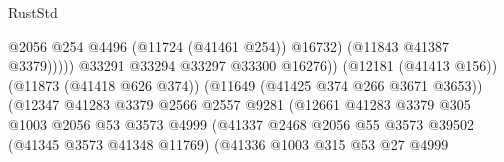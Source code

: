 \begin{lexlean}{RustStd}
\begin{coremodule}
                                                              @2056
                                                              @254
                                                              @4496
                                                              (@11724 (@41461 @254))
                                                              @16732)
                                                            (@11843 @41387 @3379)))))
                                                    @33291
                                                    @33294
                                                    @33297
                                                    @33300
                                                    @16276))
                                                (@12181 (@41413 @156))
                                                (@11873 (@41418 @626 @374))
                                                (@11649 (@41425 @374 @266 @3671 @3653))
                                                (@12347
                                                  @41283
                                                  @3379
                                                  @2566
                                                  @2557
                                                  @9281
                                                  (@12661
                                                    @41283
                                                    @3379
                                                    @305
                                                    @1003
                                                    @2056
                                                    @53
                                                    @3573
                                                    @4999
                                                    (@41337
                                                      @2468
                                                      @2056
                                                      @55
                                                      @3573
                                                      @39502
                                                      (@41345 @3573 @41348 @11769)
                                                      (@41336
                                                        @1003
                                                        @315
                                                        @53
                                                        @27
                                                        @4999

\end{coremodule}
\end{lexlean}
